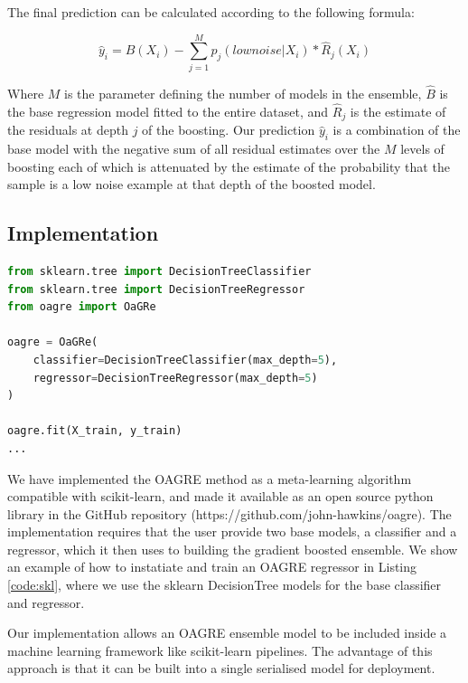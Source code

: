 \documentclass[12pt,a4paper]{article}
\begin{document}
The final prediction can be calculated according to the following formula:

\begin{equation}
\hat{y}_i = \hat{B}(X_i) - \sum_{j=1}^M p_j(low noise | X_i) * \hat{R}_j(X_i)
\label{eq:pred}
\end{equation}

Where $M$ is the parameter defining the number of models in the ensemble, $\hat{B}$ is the base regression model fitted to the
entire dataset, and $\hat{R}_j$ is the estimate of the residuals at depth $j$ of the boosting.
Our prediction $\hat{y}_i$ is a combination of the base model with the negative sum of all residual estimates over the $M$ 
levels of boosting each of which is attenuated by the estimate of the probability that the sample is a low noise example at that 
depth of the boosted model.

\subsection{Implementation}
 
\begin{lstlisting}[language=Python,label={code:skl}, caption=Usage of OAGRE with scikit-learn models ]
from sklearn.tree import DecisionTreeClassifier
from sklearn.tree import DecisionTreeRegressor
from oagre import OaGRe

oagre = OaGRe(
    classifier=DecisionTreeClassifier(max_depth=5),
    regressor=DecisionTreeRegressor(max_depth=5)
)

oagre.fit(X_train, y_train)
...
\end{lstlisting}

We have implemented the OAGRE method as a meta-learning algorithm compatible with scikit-learn\cite{pedregosa2011scikit},
and made it available as an open source python library in the GitHub repository (https://github.com/john-hawkins/oagre).
The implementation requires that the user provide two base models, a classifier and a regressor, which it then uses to
building the gradient boosted ensemble. We show an example of how to instatiate and train an OAGRE regressor in
Listing \ref{code:skl}, where we use the sklearn DecisionTree models for the base classifier and regressor.

Our implementation allows an OAGRE ensemble model to be included inside a machine learning framework like
scikit-learn pipelines\cite{pedregosa2011scikit}. The advantage of this approach is that it can be built into a single
serialised model for deployment.
\end{document}
